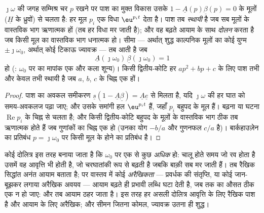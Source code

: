 \begin{theorem}[किसी रैखिक पाश का स्थायित्व; दोलन का प्रतिबंध]\label{thm:b2:feedback-oscillators:stability}
$\jmath\omega$ की जगह सम्मिश्र चर $p$ रखने पर पाश का मुक्त विकास
उसके \emph{}
$1 - \underline A(p)\underline\beta(p) = 0$ के मूलों ($\underline H$ के ध्रुवों) से चलता है: हर मूल
$p_i$ एक विधा $\eu^{p_it}$ देता है। पाश तब \emph{स्थायी} है जब सब
मूलों के वास्तविक भाग ऋणात्मक हों (तब हर विधा मर जाती है); और वह
बढ़ते आयाम के साथ \emph{दोलन} करता है जब किसी मूल का वास्तविक भाग
धनात्मक हो। सीमा --- अर्थात् शुद्ध काल्पनिक मूलों का कोई युग्म $\pm\jmath
\omega_0$, अर्थात् कोई टिकाऊ ज्यावक्र --- तब आती है जब
\[
\underline A(\jmath\omega_0)\,\underline\beta(\jmath\omega_0) = 1
\]
हो (\emph{}: $\omega_0$ पर  का मापांक एक और कला
शून्य)। किसी द्वितीय-कोटि हर $ap^2 + bp + c$ के लिए
पाश तभी और केवल तभी स्थायी है जब $a$, $b$, $c$ के चिह्न एक हों।
\end{theorem}

\begin{proof}
पाश का अवकल समीकरण $\underline s(1 -
\underline A\underline\beta) = \underline A\underline e$ से मिलता है, यदि $\jmath\omega$ की हर घात को
समय-अवकलज पढ़ा जाए; और उसके समांगी हल $\eu^{p_it}$ हैं,
जहाँ $p_i$ बहुपद के मूल हैं। बढ़ना या घटना
$\operatorname{Re}p_i$ के चिह्न से चलता है; और किसी द्वितीय-कोटि बहुपद के मूलों के
वास्तविक भाग ठीक तब ऋणात्मक होते हैं जब गुणांकों का चिह्न एक हो
(उनका योग $-b/a$ और गुणनफल $c/a$ है)। बार्कहाउज़ेन का प्रतिबंध
$p = \jmath\omega_0$ पर किसी मूल के होने का प्रतिबंध है।
\end{proof}

\begin{remark}[कोई दोलित्र कैसे चलता और रुकता है]\label{rem:b2:feedback-oscillators:start}
कोई दोलित्र इस तरह बनाया जाता है कि $\omega_0$ पर  एक से कुछ
\emph{अधिक} हो: चालू होते समय जो रव होता है उसमें वह आवृत्ति भी होती है,
जो चरघातांकी रूप से बढ़ती है जबकि बाक़ी सब मर जाती हैं। तब रैखिक सिद्धांत
अनंत आयाम बताता है; पर वास्तव में कोई \emph{अरैखिकता} ---
प्रवर्धक की संतृप्ति, या कोई जान-बूझकर लगाया अरैखिक
अवयव --- आयाम बढ़ते ही प्रभावी लब्धि घटा देती है, जब तक
 का औसत ठीक एक न हो जाए: और तब आयाम ठहर जाता है। इस तरह हर असली
दोलित्र आवृत्ति के लिए रैखिक पाश है और आयाम के लिए अरैखिक;
और सीमन जितना कोमल, ज्यावक्र उतना ही शुद्ध।
\end{remark}

